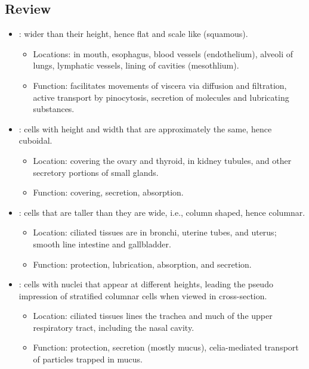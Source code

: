 \begin{itemize}
\begin{multicols}{2}
\begin{itemize}
  \end{itemize}
  \end{multicols}

  \subsection{Review}
  \begin{itemize}
    \item {}: wider than their height, hence flat and scale like (squamous). 
      \begin{itemize}
        \item Locations: in mouth, esophagus, blood vessels (endothelium), alveoli of lungs, lymphatic vessels, lining of cavities (mesothlium).
        \item Function: facilitates movements of viscera via diffusion and filtration, active transport by pinocytosis, secretion of molecules and lubricating substances. 
      \end{itemize}
    \item {}: cells with height and width that are approximately the same, hence cuboidal.
      \begin{itemize}
        \item Location: covering the ovary and thyroid, in kidney tubules, and other secretory portions of small glands.
        \item Function: covering, secretion, absorption.
      \end{itemize}
    \item {}: cells that are taller than they are wide, i.e., column shaped, hence columnar.
      \begin{itemize}
        \item Location: ciliated tissues are in bronchi, uterine tubes, and uterus; smooth line intestine and gallbladder.
        \item Function: protection, lubrication, absorption, and secretion.
      \end{itemize}
    \item {}: cells with nuclei that appear at different heights, leading the pseudo impression of stratified columnar cells when viewed in cross-section.
      \begin{itemize}
        \item Location: ciliated tissues lines the trachea and much of the upper respiratory tract, including the nasal cavity.
        \item Function: protection, secretion (mostly mucus), celia-mediated transport of particles trapped in mucus.

\end{itemize}
\end{itemize}
\end{itemize}
